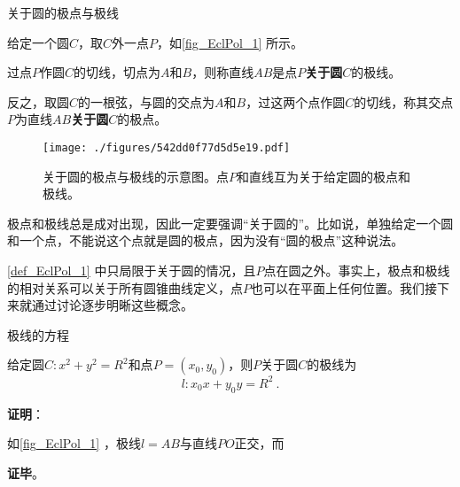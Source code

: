 





\begin{definition}{关于圆的极点与极线}\label{def_EclPol_1}

给定一个圆$C$，取$C$外一点$P$，如\autoref{fig_EclPol_1} 所示。

过点$P$作圆$C$的切线，切点为$A$和$B$，则称直线$AB$是点$P$\textbf{关于圆}$C$的极线。

反之，取圆$C$的一根弦，与圆的交点为$A$和$B$，过这两个点作圆$C$的切线，称其交点$P$为直线$AB$\textbf{关于圆}$C$的极点。

\begin{figure}[ht]
\centering
\texttt{[image: ./figures/542dd0f77d5d5e19.pdf]}
\caption{关于圆的极点与极线的示意图。点$P$和直线互为关于给定圆的极点和极线。} \label{fig_EclPol_1}
\end{figure}

\end{definition}




极点和极线总是成对出现，因此一定要强调“关于圆的”。比如说，单独给定一个圆和一个点，不能说这个点就是圆的极点，因为没有“圆的极点”这种说法。

\autoref{def_EclPol_1} 中只局限于关于圆的情况，且$P$点在圆之外。事实上，极点和极线的相对关系可以关于所有圆锥曲线定义，点$P$也可以在平面上任何位置。我们接下来就通过讨论逐步明晰这些概念。




\begin{theorem}{极线的方程}

给定圆$C:x^2+y^2=R^2$和点$P=(x_0, y_0)$，则$P$关于圆$C$的极线为
\begin{equation}
l: x_0x+y_0y = R^2~. 
\end{equation}

\end{theorem}



\textbf{证明}：

如\autoref{fig_EclPol_1} ，极线$l=AB$与直线$PO$正交，而

\textbf{证毕}。


















